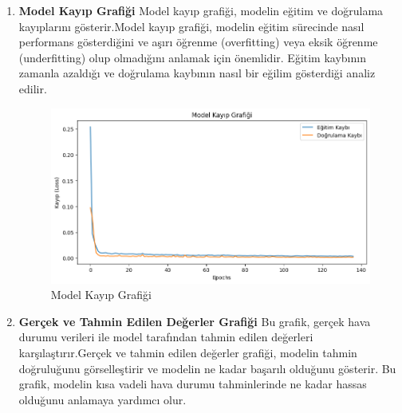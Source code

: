 \documentclass[12pt,a4paper]{article}
\begin{document}
\begin{enumerate}
\newpage

\item {\bf\fontsize{12pt}{14pt}\selectfont Model Kayıp Grafiği }\newline\newline
  Model kayıp grafiği, modelin eğitim ve doğrulama kayıplarını gösterir.Model kayıp grafiği, modelin eğitim sürecinde nasıl performans gösterdiğini ve aşırı öğrenme (overfitting) veya eksik öğrenme (underfitting) olup olmadığını anlamak için önemlidir. Eğitim kaybının zamanla azaldığı ve doğrulama kaybının nasıl bir eğilim gösterdiği analiz edilir\cite{lgrafik}.
\begin{figure}[h]
  	
  	\vspace{0.5cm} 
  	\centering
  	 \includegraphics[width=\textwidth,height=\textheight,keepaspectratio]{MkayıpGrafiği.png}
  	\caption{Model Kayıp Grafiği}
  		\vspace{0.7cm}
  	
  \end{figure}
\newpage
\item {\bf\fontsize{12pt}{14pt}\selectfont  Gerçek ve Tahmin Edilen Değerler Grafiği }\newline\newline
Bu grafik, gerçek hava durumu verileri ile model tarafından tahmin edilen değerleri karşılaştırır.Gerçek ve tahmin edilen değerler grafiği, modelin tahmin doğruluğunu görselleştirir ve modelin ne kadar başarılı olduğunu gösterir. Bu grafik, modelin kısa vadeli hava durumu tahminlerinde ne kadar hassas olduğunu anlamaya yardımcı olur\cite{lgrafik}.

\begin{figure}[h]
  	

\end{figure}
\end{enumerate}
\end{document}
